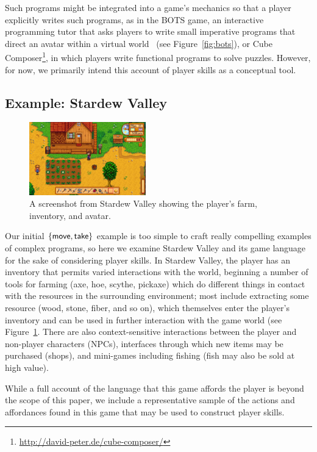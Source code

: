 Such programs might be integrated into a game's mechanics so that a player
explicitly writes such programs, as in the BOTS game, an interactive
programming tutor that asks players to write small imperative programs that
direct an avatar within a virtual world~\cite{hicks2012creation} (see
Figure~\ref{fig:bots}), or Cube
Composer\footnote{\url{http://david-peter.de/cube-composer/}}, in which
players write functional programs to solve puzzles. However, for now, we
primarily intend this account of player skills as a conceptual tool.

\subsection{Example: Stardew Valley}

\begin{figure}
  \includegraphics[width=0.45\textwidth]{stardew-valley.png}
  \caption{A screenshot from Stardew Valley showing the player's farm,
  inventory, and avatar.}
  \label{fig:stardew}
\end{figure}

Our initial $\{\mathsf{move}, \mathsf{take}\}$ example is too simple to craft really
compelling examples of complex programs, so here we examine
Stardew Valley and its game language for the sake of considering player
skills. In Stardew Valley, the player has an inventory that permits varied
interactions with the world, beginning a number of tools for farming (axe,
hoe, scythe, pickaxe) which do different things in contact with the
resources in the surrounding environment; most include extracting some
resource (wood, stone, fiber, and so on), which themselves enter the
player's inventory and can be used in further interaction with the game
world (see Figure~\ref{fig:stardew}. 
There are also context-sensitive interactions between the player and
non-player characters (NPCs), interfaces through which new items may be
purchased (shops), and mini-games including fishing (fish may also be sold
at high value). 

While a full account of the language that this game affords the player is
beyond the scope of this paper, we include a representative sample of the
actions and affordances found in this game that may be used to construct
player skills.

